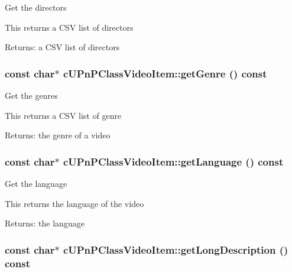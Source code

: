 Get the directors

This returns a CSV list of directors

\begin{Desc}
\item[Returns:]a CSV list of directors \end{Desc}
\hypertarget{classcUPnPClassVideoItem_b3ca922f5605d81bd8d3457fa19e228d}{
\subsubsection[{getGenre}]{\setlength{\rightskip}{0pt plus 5cm}const char$\ast$ cUPnPClassVideoItem::getGenre () const}}
\label{classcUPnPClassVideoItem_b3ca922f5605d81bd8d3457fa19e228d}


Get the genres

This returns a CSV list of genre

\begin{Desc}
\item[Returns:]the genre of a video \end{Desc}
\hypertarget{classcUPnPClassVideoItem_4d134ac251a6c9b67a002d6fa831bf1c}{
\subsubsection[{getLanguage}]{\setlength{\rightskip}{0pt plus 5cm}const char$\ast$ cUPnPClassVideoItem::getLanguage () const}}
\label{classcUPnPClassVideoItem_4d134ac251a6c9b67a002d6fa831bf1c}


Get the language

This returns the language of the video

\begin{Desc}
\item[Returns:]the language \end{Desc}
\hypertarget{classcUPnPClassVideoItem_29f6f76f4ac21d6c15dbe2eb95a7d0c6}{
\subsubsection[{getLongDescription}]{\setlength{\rightskip}{0pt plus 5cm}const char$\ast$ cUPnPClassVideoItem::getLongDescription () const}}
\label{classcUPnPClassVideoItem_29f6f76f4ac21d6c15dbe2eb95a7d0c6}


